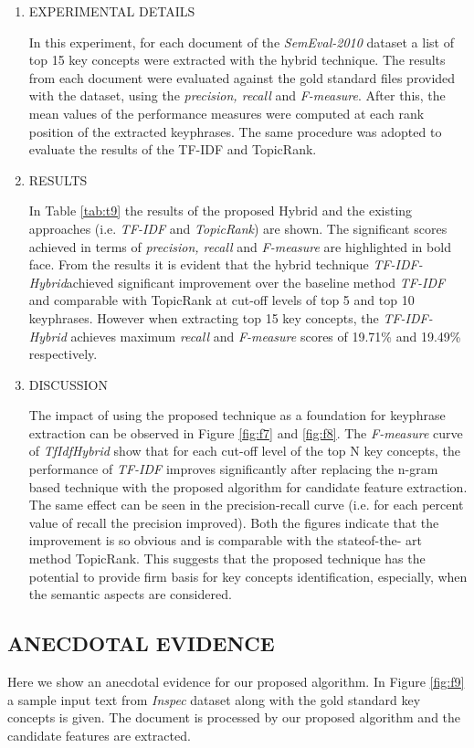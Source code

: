 \documentclass{ieeeaccess}
\begin{document}
\begin{enumerate}
   \item{EXPERIMENTAL DETAILS}
	
In this experiment, for each document of the \textit{SemEval-2010} dataset a list of top 15 key concepts were extracted with the hybrid technique. The results from each document were evaluated against the gold standard files provided with the dataset, using the \textit{precision, recall} and \textit{F-measure}. After this, the mean values of the performance measures were computed at each rank position of the extracted keyphrases. The same procedure was adopted to evaluate the results of the TF-IDF and TopicRank.


   \item{RESULTS}
	
In Table \ref{tab:t9} the results of the proposed Hybrid and the existing approaches (i.e. \textit{TF-IDF} and \textit{TopicRank}) are shown. The significant scores achieved in terms of \textit{precision, recall} and \textit{F-measure} are highlighted in bold face. From the results it is evident that the hybrid technique \textit{TF-IDF-Hybrid}achieved significant improvement over the baseline method \textit{TF-IDF} and comparable with TopicRank at cut-off levels of top 5 and top 10 keyphrases. However when extracting top 15 key concepts, the \textit{TF-IDF-Hybrid} achieves maximum \textit{recall} and \textit{F-measure} scores of 19.71\% and 19.49\% respectively.

	\item{DISCUSSION}
	
The impact of using the proposed technique as a foundation for keyphrase extraction can be observed in Figure \ref{fig:f7} and \ref{fig:f8}. The \textit{F-measure} curve of \textit{TfIdfHybrid} show that for each cut-off level of the top N key concepts, the performance of \textit{TF-IDF} improves significantly after replacing the n-gram based technique with the proposed algorithm for candidate feature extraction. The same effect can be seen in the precision-recall curve (i.e. for each percent value of recall the precision improved). Both the figures indicate that the improvement is so obvious and is comparable with the stateof-the- art method TopicRank. This suggests that the proposed technique has the potential to provide firm basis for key concepts identification, especially, when the semantic aspects are considered.
\end{enumerate}


\subsection{ANECDOTAL EVIDENCE}
Here we show an anecdotal evidence for our proposed algorithm. In Figure \ref{fig:f9} a sample input text from \textit{Inspec} dataset
along with the gold standard key concepts is given. The document is processed by our proposed algorithm and the candidate features are extracted. 
\end{document}
